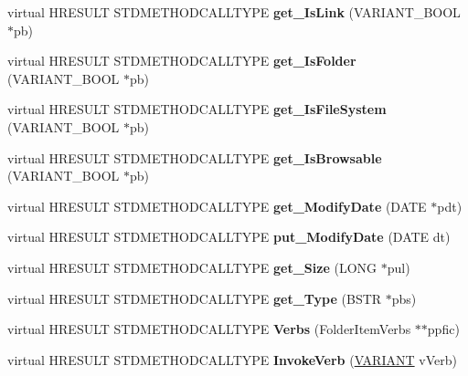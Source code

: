 \begin{DoxyCompactItemize}
\item 
\mbox{\label{class_c_folder_item_ab36f5fed7d01a4b354c51d28ba11e7a1}} 
virtual H\+R\+E\+S\+U\+LT S\+T\+D\+M\+E\+T\+H\+O\+D\+C\+A\+L\+L\+T\+Y\+PE {\bfseries get\+\_\+\+Is\+Link} (V\+A\+R\+I\+A\+N\+T\+\_\+\+B\+O\+OL $\ast$pb)
\item 
\mbox{\label{class_c_folder_item_aed41da2846b3fe546f73b3bdbe35e8d3}} 
virtual H\+R\+E\+S\+U\+LT S\+T\+D\+M\+E\+T\+H\+O\+D\+C\+A\+L\+L\+T\+Y\+PE {\bfseries get\+\_\+\+Is\+Folder} (V\+A\+R\+I\+A\+N\+T\+\_\+\+B\+O\+OL $\ast$pb)
\item 
\mbox{\label{class_c_folder_item_aeeeb77ec066839835f21cb2394b23c77}} 
virtual H\+R\+E\+S\+U\+LT S\+T\+D\+M\+E\+T\+H\+O\+D\+C\+A\+L\+L\+T\+Y\+PE {\bfseries get\+\_\+\+Is\+File\+System} (V\+A\+R\+I\+A\+N\+T\+\_\+\+B\+O\+OL $\ast$pb)
\item 
\mbox{\label{class_c_folder_item_a0da0e972b92882e932cc371bf655054a}} 
virtual H\+R\+E\+S\+U\+LT S\+T\+D\+M\+E\+T\+H\+O\+D\+C\+A\+L\+L\+T\+Y\+PE {\bfseries get\+\_\+\+Is\+Browsable} (V\+A\+R\+I\+A\+N\+T\+\_\+\+B\+O\+OL $\ast$pb)
\item 
\mbox{\label{class_c_folder_item_a055449ee6104589568a6d826ed74b4be}} 
virtual H\+R\+E\+S\+U\+LT S\+T\+D\+M\+E\+T\+H\+O\+D\+C\+A\+L\+L\+T\+Y\+PE {\bfseries get\+\_\+\+Modify\+Date} (D\+A\+TE $\ast$pdt)
\item 
\mbox{\label{class_c_folder_item_adae21f614223e0c1c6b959b6cfee3230}} 
virtual H\+R\+E\+S\+U\+LT S\+T\+D\+M\+E\+T\+H\+O\+D\+C\+A\+L\+L\+T\+Y\+PE {\bfseries put\+\_\+\+Modify\+Date} (D\+A\+TE dt)
\item 
\mbox{\label{class_c_folder_item_a6fad38244f4df9aa6c86ce89d26728c4}} 
virtual H\+R\+E\+S\+U\+LT S\+T\+D\+M\+E\+T\+H\+O\+D\+C\+A\+L\+L\+T\+Y\+PE {\bfseries get\+\_\+\+Size} (L\+O\+NG $\ast$pul)
\item 
\mbox{\label{class_c_folder_item_ad211389d8dc85bff6c830168d74f8250}} 
virtual H\+R\+E\+S\+U\+LT S\+T\+D\+M\+E\+T\+H\+O\+D\+C\+A\+L\+L\+T\+Y\+PE {\bfseries get\+\_\+\+Type} (B\+S\+TR $\ast$pbs)
\item 
\mbox{\label{class_c_folder_item_a4ba5f0c136c64532d1f9591c523c77c7}} 
virtual H\+R\+E\+S\+U\+LT S\+T\+D\+M\+E\+T\+H\+O\+D\+C\+A\+L\+L\+T\+Y\+PE {\bfseries Verbs} (Folder\+Item\+Verbs $\ast$$\ast$ppfic)
\item 
\mbox{\label{class_c_folder_item_ac68219d097dca4275a12d57c40b92610}} 
virtual H\+R\+E\+S\+U\+LT S\+T\+D\+M\+E\+T\+H\+O\+D\+C\+A\+L\+L\+T\+Y\+PE {\bfseries Invoke\+Verb} (\hyperlink{structtag_v_a_r_i_a_n_t}{V\+A\+R\+I\+A\+NT} v\+Verb)
\end{DoxyCompactItemize}
